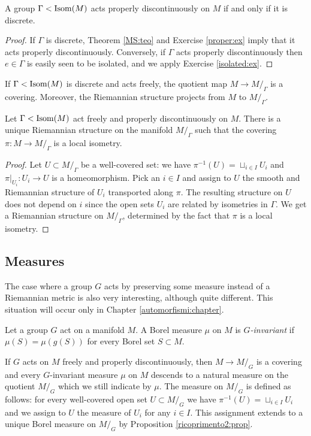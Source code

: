 \begin{prop} \label{iff:discrete:prop}
A group $\Gamma<{\rm Isom}(M)$ acts properly discontinuously on $M$ if and only if it is discrete.
\end{prop}
\begin{proof}
If $\Gamma$ is discrete, Theorem \ref{MS:teo} and Exercise \ref{proper:ex} imply that it acts properly discontinuously. Conversely, if $\Gamma$ acts properly discontinuously then $e\in \Gamma$ is easily seen to be isolated, and we apply Exercise \ref{isolated:ex}.
\end{proof}

If $\Gamma < {\rm Isom}(M)$ is discrete and acts freely, the quotient map $M \to M/_\Gamma$ is a covering. Moreover, the Riemannian structure projects from $M$ to $M/_\Gamma$.

\begin{prop} \label{quotient:prop}
Let $\Gamma <{\rm Isom}(M)$ act freely and properly discontinuously on $M$. There is a unique Riemannian structure on the manifold $M/_\Gamma$ such that the covering $\pi\colon M \to M/_\Gamma$ is a local isometry.
\end{prop}
\begin{proof}
Let $U\subset M/_\Gamma$ be a well-covered set: we have $\pi^{-1}(U) = \sqcup_{i\in I} U_i$ and $\pi|_{U_i}\colon U_i \to U$ is a homeomorphism. Pick an $i\in I$ and assign to $U$ the smooth and Riemannian structure of $U_i$ transported along $\pi$. The resulting structure on $U$ does not depend on $i$ since the open sets $U_i$ are related by isometries in $\Gamma$. We get a Riemannian structure on $M/_\Gamma$, determined by the fact that $\pi$ is a local isometry.
\end{proof}

\subsection{Measures} \label{measure:descends:subsection}
The case where a group $G$ acts by preserving some measure instead of a Riemannian metric is also very interesting, although quite different. This situation will occur only in Chapter \ref{automorfismi:chapter}.

Let a group $G$ act on a manifold $M$. A Borel measure $\mu$ on $M$ is \emph{$G$-invariant} if $\mu(S) = \mu(g(S))$ for every Borel set $S\subset M$. 

If $G$ acts on $M$ freely and properly discontinuously, then $M \to M/_G$ is a covering and every $G$-invariant measure $\mu$ on $M$ descends to a natural measure on the quotient $M/_G$ which we still indicate by $\mu$. The measure on $M/_G$ is defined as follows: for every well-covered open set $U\subset M/_G$ we have $\pi^{-1}(U) = \sqcup_{i\in I}U_i$ and we assign to $U$ the measure of $U_i$ for any $i\in I$. This assignment extends to a unique Borel measure on $M/_G$ by Proposition \ref{ricoprimento2:prop}.


